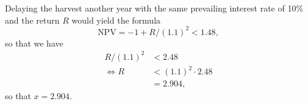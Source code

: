 Delaying the harvest another year with the same prevailing interest rate of
10\% and the return $R$ would yield the formula
\[
    \text{NPV} = -1 + R / {(1.1)}^2 < 1.48,
\]
so that we have
\begin{equation*}
    \begin{split}
        R / {(1.1)}^2 &< 2.48 \\
        \Leftrightarrow R &< {(1.1)}^2 \cdot 2.48 \\
        &= 2.904,
    \end{split}
\end{equation*}
so that $x = 2.904$.
